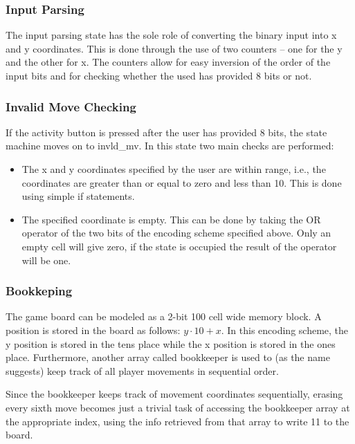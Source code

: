 \documentclass[conference]{IEEEtran}
\begin{document}
   \subsubsection{Input Parsing}
   The input parsing state has the sole role of converting the binary input into x and y coordinates. This is done through the use of two counters – one for the y and the other for x. The counters allow for easy inversion of the order of the input bits and for checking whether the used has provided 8 bits or not. \\
\subsubsection{Invalid Move Checking}
If the activity button is pressed after the user has provided 8 bits, the state machine moves on to invld\_mv. In this state two main checks are performed: \begin{itemize} 
\item The x and y coordinates specified by the user are within range, i.e., the coordinates are greater than or equal to zero and less than 10. This is done using simple if statements.
\item The specified coordinate is empty. This can be done by taking the OR operator of the two bits of the encoding scheme specified above. Only an empty cell will give zero, if the state is occupied the result of the operator will be one.
\end{itemize}
\subsubsection{Bookkeping}
The game board can be modeled as a 2-bit 100 cell wide memory block. A position is stored in the board as follows: \(y \cdot 10 + x\). In this encoding scheme, the y position is stored in the tens place while the x position is stored in the ones place. Furthermore, another array called bookkeeper is used to (as the name suggests) keep track of all player movements in sequential order. \\
\par Since the bookkeeper keeps track of movement coordinates sequentially, erasing every sixth move becomes just a trivial task of accessing the bookkeeper array at the appropriate index, using the info retrieved from that array to write 11 to the board. \\
\end{document}
